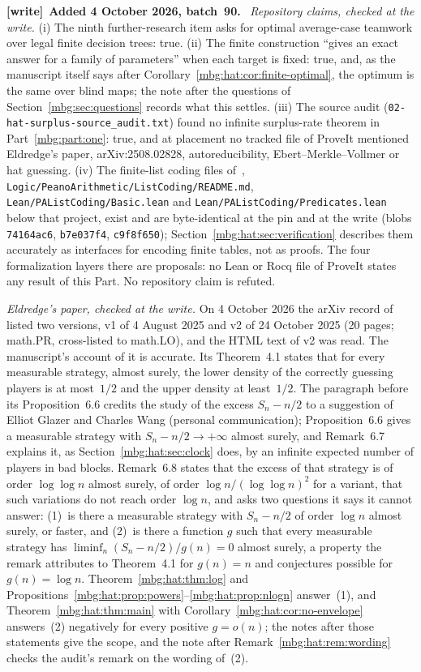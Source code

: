 \documentclass[11pt,letterpaper]{article}
\theoremstyle{definition}
\newenvironment{writenote}[1][]{\par\smallskip\begingroup\small
 \noindent\textbf{[write]}\if\relax\detokenize{#1}\relax\else~\textbf{#1.}\fi\ }%
 {\par\endgroup\smallskip}
\begin{document}
\begin{writenote}[Added 4 October 2026, batch~90]
\emph{Repository claims, checked at the write.} (i) The ninth further-research item asks for optimal average-case teamwork over legal finite decision trees: true. (ii) The finite construction ``gives an exact answer for a family of parameters'' when each target is fixed: true, and, as the manuscript itself says after Corollary~\ref{mbg:hat:cor:finite-optimal}, the optimum is the same over blind maps; the note after the questions of Section~\ref{mbg:sec:questions} records what this settles. (iii) The source audit (\texttt{02-hat-surplus-\allowbreak source\_\allowbreak audit.txt}) found no infinite surplus-rate theorem in Part~\ref{mbg:part:one}: true, and at placement no tracked file of ProveIt mentioned Eldredge's paper, arXiv:2508.02828, autoreducibility, Ebert--Merkle--Vollmer or hat guessing. (iv) The finite-list coding files of~\cite{hat:ProveItCoding}, \nolinkurl{Logic/PeanoArithmetic/ListCoding/README.md}, \nolinkurl{Lean/PAListCoding/Basic.lean} and \nolinkurl{Lean/PAListCoding/Predicates.lean} below that project, exist and are byte-identical at the pin and at the write (blobs \texttt{74164ac6}, \texttt{b7e037f4}, \texttt{c9f8f650}); Section~\ref{mbg:hat:sec:verification} describes them accurately as interfaces for encoding finite tables, not as proofs. The four formalization layers there are proposals: no Lean or Rocq file of ProveIt states any result of this Part. No repository claim is refuted.

\emph{Eldredge's paper, checked at the write.} On 4 October 2026 the arXiv record of~\cite{hat:Eldredge} listed two versions, v1 of 4 August 2025 and v2 of 24 October 2025 (20 pages; math.PR, cross-listed to math.LO), and the HTML text of v2 was read. The manuscript's account of it is accurate. Its Theorem~4.1 states that for every measurable strategy, almost surely, the lower density of the correctly guessing players is at most~$1/2$ and the upper density at least~$1/2$. The paragraph before its Proposition~6.6 credits the study of the excess $S_n-n/2$ to a suggestion of Elliot Glazer and Charles Wang (personal communication); Proposition~6.6 gives a measurable strategy with $S_n-n/2\to+\infty$ almost surely, and Remark~6.7 explains it, as Section~\ref{mbg:hat:sec:clock} does, by an infinite expected number of players in bad blocks. Remark~6.8 states that the excess of that strategy is of order $\log\log n$ almost surely, of order $\log n/(\log\log n)^2$ for a variant, that such variations do not reach order $\log n$, and asks two questions it says it cannot answer: (1)~is there a measurable strategy with $S_n-n/2$ of order $\log n$ almost surely, or faster, and (2)~is there a function $g$ such that every measurable strategy has $\liminf_n(S_n-n/2)/g(n)=0$ almost surely, a property the remark attributes to Theorem~4.1 for $g(n)=n$ and conjectures possible for $g(n)=\log n$. Theorem~\ref{mbg:hat:thm:log} and Propositions~\ref{mbg:hat:prop:powers}--\ref{mbg:hat:prop:nlogn} answer~(1), and Theorem~\ref{mbg:hat:thm:main} with Corollary~\ref{mbg:hat:cor:no-envelope} answers~(2) negatively for every positive $g=o(n)$; the notes after those statements give the scope, and the note after Remark~\ref{mbg:hat:rem:wording} checks the audit's remark on the wording of~(2).


\end{writenote}
\end{document}
